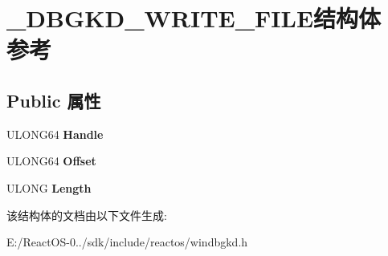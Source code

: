 \hypertarget{struct___d_b_g_k_d___w_r_i_t_e___f_i_l_e}{}\section{\+\_\+\+D\+B\+G\+K\+D\+\_\+\+W\+R\+I\+T\+E\+\_\+\+F\+I\+L\+E结构体 参考}
\label{struct___d_b_g_k_d___w_r_i_t_e___f_i_l_e}
\subsection*{Public 属性}
\begin{DoxyCompactItemize}
\item 
\mbox{\label{struct___d_b_g_k_d___w_r_i_t_e___f_i_l_e_a3e6f3755bbec74761b686d53724da04d}} 
U\+L\+O\+N\+G64 {\bfseries Handle}
\item 
\mbox{\label{struct___d_b_g_k_d___w_r_i_t_e___f_i_l_e_a2e2f8240aaf3b4435d159ab660c3a730}} 
U\+L\+O\+N\+G64 {\bfseries Offset}
\item 
\mbox{\label{struct___d_b_g_k_d___w_r_i_t_e___f_i_l_e_add694849fb2137a33be9ba2ba6e75550}} 
U\+L\+O\+NG {\bfseries Length}
\end{DoxyCompactItemize}


该结构体的文档由以下文件生成\+:\begin{DoxyCompactItemize}
\item 
E\+:/\+React\+O\+S-\/0../sdk/include/reactos/windbgkd.\+h\end{DoxyCompactItemize}
